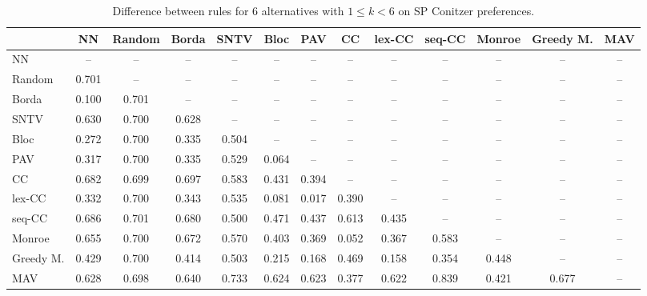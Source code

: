 
\begin{table*}[h!]
\centering
\begin{tabular}{lcccccccccccc}
\toprule
 & NN & Random & Borda & SNTV & Bloc & PAV & CC & lex-CC & seq-CC & Monroe & Greedy M. & MAV \\
\midrule
NN & -- & -- & -- & -- & -- & -- & -- & -- & -- & -- & -- & -- \\
Random & 0.701 & -- & -- & -- & -- & -- & -- & -- & -- & -- & -- & -- \\
Borda & 0.100 & 0.701 & -- & -- & -- & -- & -- & -- & -- & -- & -- & -- \\
SNTV & 0.630 & 0.700 & 0.628 & -- & -- & -- & -- & -- & -- & -- & -- & -- \\
Bloc & 0.272 & 0.700 & 0.335 & 0.504 & -- & -- & -- & -- & -- & -- & -- & -- \\
PAV & 0.317 & 0.700 & 0.335 & 0.529 & 0.064 & -- & -- & -- & -- & -- & -- & -- \\
CC & 0.682 & 0.699 & 0.697 & 0.583 & 0.431 & 0.394 & -- & -- & -- & -- & -- & -- \\
lex-CC & 0.332 & 0.700 & 0.343 & 0.535 & 0.081 & 0.017 & 0.390 & -- & -- & -- & -- & -- \\
seq-CC & 0.686 & 0.701 & 0.680 & 0.500 & 0.471 & 0.437 & 0.613 & 0.435 & -- & -- & -- & -- \\
Monroe & 0.655 & 0.700 & 0.672 & 0.570 & 0.403 & 0.369 & 0.052 & 0.367 & 0.583 & -- & -- & -- \\
Greedy M. & 0.429 & 0.700 & 0.414 & 0.503 & 0.215 & 0.168 & 0.469 & 0.158 & 0.354 & 0.448 & -- & -- \\
MAV & 0.628 & 0.698 & 0.640 & 0.733 & 0.624 & 0.623 & 0.377 & 0.622 & 0.839 & 0.421 & 0.677 & -- \\
\bottomrule
\end{tabular}

\caption{Difference between rules for 6 alternatives with $1 \leq k < 6$ on SP Conitzer preferences.}
\end{table*}
